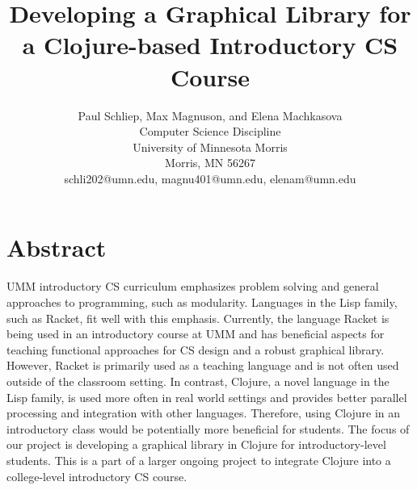 \documentclass[12pt]{article}
\newcommand{\comment}[1]{{\bf \tt  {#1}}}
\begin{document}
\pagestyle{plain}
%

\title{Developing a Graphical Library for a Clojure-based Introductory CS Course}
%
%

\author{
Paul Schliep, Max Magnuson, and Elena Machkasova \\
Computer Science Discipline \\
University of Minnesota Morris\\
Morris, MN 56267\\
schli202@umn.edu, magnu401@umn.edu, elenam@umn.edu
}

\date{}

\maketitle
\thispagestyle{empty}

\section*{\centering Abstract}
UMM introductory CS curriculum emphasizes problem solving and general approaches to programming, such as modularity. Languages in the Lisp family, such as Racket, fit well with this emphasis. Currently, the language Racket is being used in an introductory course at UMM and has beneficial aspects for teaching functional approaches for CS design and a robust graphical library. However, Racket is primarily used as a teaching language and is not often used outside of the classroom setting. In contrast, Clojure, a novel language in the Lisp family, is used more often in real world settings and provides better parallel processing and integration with other languages. Therefore, using Clojure in an introductory class would be potentially more beneficial for students. The focus of our project is developing a graphical library in Clojure for introductory-level students. This is a part of a larger ongoing project to integrate Clojure into a college-level introductory CS course.
\end{document}
